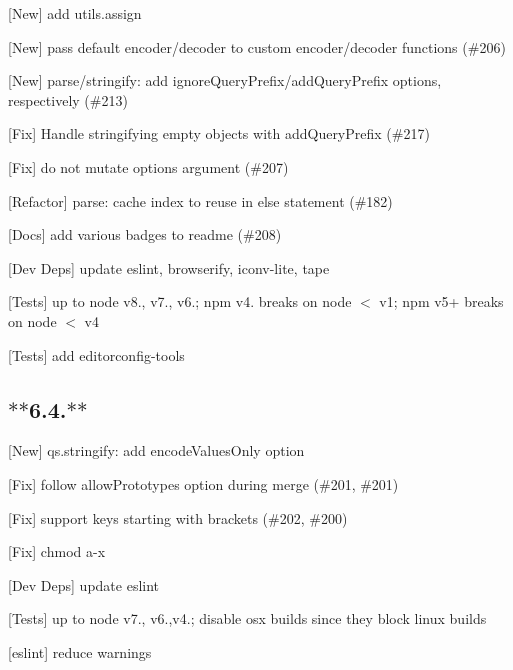 \begin{DoxyItemize}
\item \mbox{[}New\mbox{]} add {\ttfamily utils.\+assign}
\item \mbox{[}New\mbox{]} pass default encoder/decoder to custom encoder/decoder functions (\#206)
\item \mbox{[}New\mbox{]} {\ttfamily parse}/{\ttfamily stringify}\+: add {\ttfamily ignore\+Query\+Prefix}/{\ttfamily add\+Query\+Prefix} options, respectively (\#213)
\item \mbox{[}Fix\mbox{]} Handle stringifying empty objects with add\+Query\+Prefix (\#217)
\item \mbox{[}Fix\mbox{]} do not mutate {\ttfamily options} argument (\#207)
\item \mbox{[}Refactor\mbox{]} {\ttfamily parse}\+: cache index to reuse in else statement (\#182)
\item \mbox{[}Docs\mbox{]} add various badges to readme (\#208)
\item \mbox{[}Dev Deps\mbox{]} update {\ttfamily eslint}, {\ttfamily browserify}, {\ttfamily iconv-\/lite}, {\ttfamily tape}
\item \mbox{[}Tests\mbox{]} up to {\ttfamily node} {\ttfamily v8.}, {\ttfamily v7.}, {\ttfamily v6.}; npm v4. breaks on node $<$ v1; npm v5+ breaks on node $<$ v4
\item \mbox{[}Tests\mbox{]} add {\ttfamily editorconfig-\/tools}
\end{DoxyItemize}

\subsection*{$\ast$$\ast$6.4.$\ast$$\ast$}


\begin{DoxyItemize}
\item \mbox{[}New\mbox{]} {\ttfamily qs.\+stringify}\+: add {\ttfamily encode\+Values\+Only} option
\item \mbox{[}Fix\mbox{]} follow {\ttfamily allow\+Prototypes} option during merge (\#201, \#201)
\item \mbox{[}Fix\mbox{]} support keys starting with brackets (\#202, \#200)
\item \mbox{[}Fix\mbox{]} chmod a-\/x
\item \mbox{[}Dev Deps\mbox{]} update {\ttfamily eslint}
\item \mbox{[}Tests\mbox{]} up to {\ttfamily node} {\ttfamily v7.}, {\ttfamily v6.},{\ttfamily v4.}; disable osx builds since they block linux builds
\item \mbox{[}eslint\mbox{]} reduce warnings
\end{DoxyItemize}

